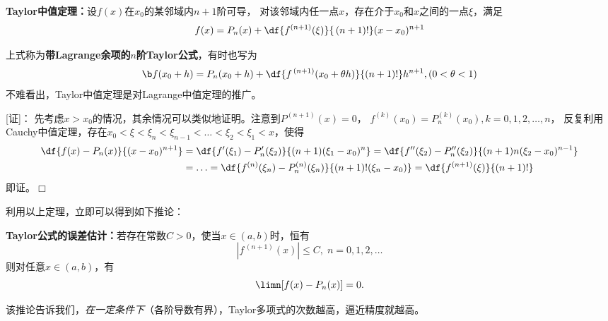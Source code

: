 \begin{thx}
	{\bf Taylor中值定理：}设$f(x)$在$x_0$的某邻域内$n+1$阶可导，
	对该邻域内任一点$x$，存在介于$x_0$和$x$之间的一点$\xi$，满足
	$$f(x)=P_n(x)+\df{f^{(n+1)}(\xi)}{\,(n+1)!}(x-x_0)^{n+1}$$
\end{thx}

上式称为{\bf 带Lagrange余项的$n$阶Taylor公式}，有时也写为
$${\b f(x_0+h)=P_n(x_0+h)+\df{f^{\,(n+1)}(x_0+\theta
h)}{(n+1)!}h^{n+1},(0<\theta<1)}$$
不难看出，Taylor中值定理是对Lagrange中值定理的推广。

[证]：
先考虑$x>x_0$的情况，其余情况可以类似地证明。注意到$P^{(n+1)}(x)=0$，
$f^{(k)}(x_0)=P^{(k)}_n(x_0),k=0,1,2,\ldots,n$，
反复利用Cauchy中值定理，存在$x_0<\xi<\xi_n<\xi_{n-1}
<\ldots<\xi_2<\xi_1<x$，使得
\begin{align}
	\df{f(x)-P_n(x)}{(x-x_0)^{n+1}}
	&=\df{f'(\xi_1)-P'_n(\xi_2)}{(n+1)(\xi_1-x_0)^{n}}
	=\df{f''(\xi_2)-P''_n(\xi_2)}{(n+1)n(\xi_2-x_0)^{n-1}}\notag\\
	&=\ldots=\df{f^{(n)}(\xi_n)-P^{(n)}_n(\xi_n)}{(n+1)!(\xi_n-x_0)}
	=\df{f^{(n+1)}(\xi)}{(n+1)!}\notag
\end{align}
即证。\hfill$\Box$

利用以上定理，立即可以得到如下推论：
\begin{thx}
	{\bf Taylor公式的误差估计：}若存在常数$C>0$，使当$x\in(a,b)$时，恒有
	$$|f^{\,(n+1)}(x)|\leq C,\;n=0,1,2,\ldots$$
	则对任意$x\in(a,b)$，有
	$$\limn [f(x)-P_n(x)]=0.$$
\end{thx}
该推论告诉我们，{\it 在一定条件下}（各阶导数有界），Taylor多项式的次数越高，逼近精度就越高。

